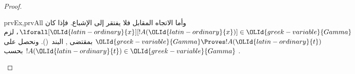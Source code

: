 \documentclass[../../../include/open-logic-section]{subfiles}
\begin{document}
\begin{proof}
\begin{tagenumerate}{prvEx,prvAll}
{{      وأما الاتجاه المقابل فلا يفتقر إلى الإشباع. فإذا كان
      $\lforall[\OLId{latin-ordinary}{x}][!A(\OLId{latin-ordinary}{x})] \in \OLId{greek-variable}{Gamma}$، لزم $\OLId{greek-variable}{Gamma} \Proves !A(\OLId{latin-ordinary}{t})$
      بمقتضى
      ,
      البند~(). ونحصل على $!A(\OLId{latin-ordinary}{t}) \in \OLId{greek-variable}{Gamma}$ بحسب
      .}}{}
  \end{tagenumerate}
\end{proof}
\end{document}
